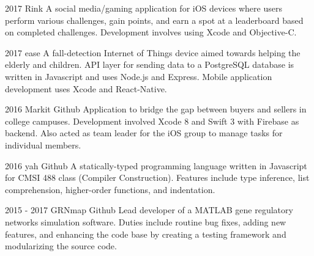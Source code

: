 \documentclass[]{friggeri-cv} %
\begin{document}
  \begin{entrylist}
  
    \entry
      {2017}
      {Rink}
      {}
      {A social media/gaming application for iOS devices where users perform various challenges, gain points, and earn a spot at a leaderboard based on completed challenges. Development involves using Xcode and Objective-C. }


    \entry
      {2017}
      {ease}
      {}
      {A fall-detection Internet of Things device aimed towards helping the elderly and children. API layer for sending data to a PostgreSQL database is written in Javascript and uses Node.js and Express. Mobile application development uses Xcode and React-Native.}


    \entry
      {2016}
      {Markit}
      {Github}
      {Application to bridge the gap between buyers and sellers in college campuses. Development involved Xcode 8 and Swift 3 with Firebase as backend. Also acted as team leader for the iOS group to manage tasks for individual members.}

    
    \entry
      {2016}
      {yah}
      {Github}
      {A statically-typed programming language written in Javascript for CMSI 488 class (Compiler Construction). Features include type inference, list comprehension, higher-order functions, and indentation.}


    \entry
      {2015 - 2017}
      {GRNmap}
      {Github}
      {Lead developer of a MATLAB gene regulatory networks simulation software. Duties include routine bug fixes, adding new features, and enhancing the code base by creating a testing framework and modularizing the source code.}



  
  \end{entrylist}
\end{document}

